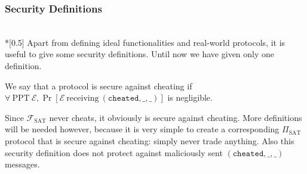 \subsubsection{Security Definitions} \ \\*[0.5\baselineskip]
  Apart from defining ideal functionalities and real-world protocols, it is useful to give
  some security definitions. Until now we have given only one definition.

  \begin{definition}
  \label{def:nocheatsec}
    We say that a protocol is secure against cheating if $\forall \: \mathrm{PPT} \:
    \mathcal{E}, \Pr\left[\mathcal{E} \: \mathrm{receiving} \: \left(\mathtt{cheated, \_,
    \_}\right)\right]$ is negligible.
  \end{definition}

  Since $\mathcal{F}_{\mathrm{SAT}}$ never cheats, it obviously is secure against
  cheating. More definitions will be needed however, because it is very simple to create a
  corresponding $\Pi_{\mathrm{SAT}}$ protocol that is secure against cheating: simply
  never trade anything. Also this security definition does not protect against maliciously
  sent $(\mathtt{cheated}, \_, \_)$ messages.
